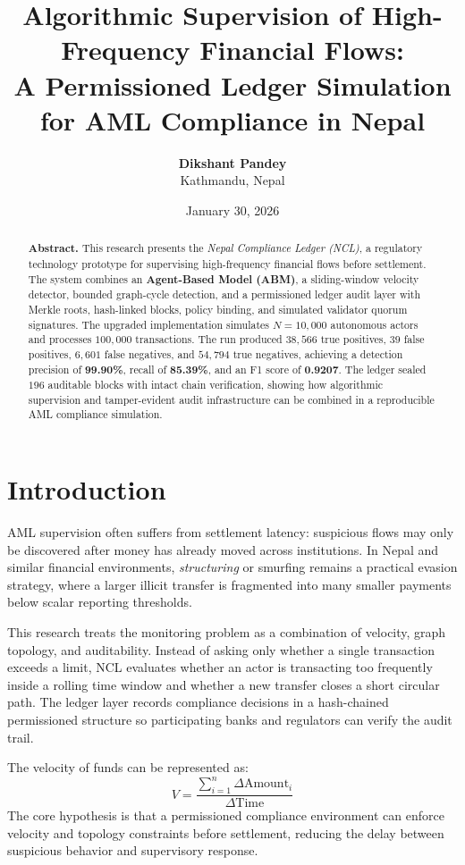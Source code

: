 \documentclass[11pt, letterpaper]{article}
\title{\textbf{Algorithmic Supervision of High-Frequency Financial Flows: \\ A Permissioned Ledger Simulation for AML Compliance in Nepal}}
\author{\textbf{Dikshant Pandey} \\ Kathmandu, Nepal}
\date{January 30, 2026}
\begin{document}
\maketitle

\begin{abstract}
\noindent \textbf{Abstract.} This research presents the \textit{Nepal Compliance Ledger (NCL)}, a regulatory technology prototype for supervising high-frequency financial flows before settlement. The system combines an \textbf{Agent-Based Model (ABM)}, a sliding-window velocity detector, bounded graph-cycle detection, and a permissioned ledger audit layer with Merkle roots, hash-linked blocks, policy binding, and simulated validator quorum signatures. The upgraded implementation simulates $N=10{,}000$ autonomous actors and processes $100{,}000$ transactions. The run produced $38{,}566$ true positives, $39$ false positives, $6{,}601$ false negatives, and $54{,}794$ true negatives, achieving a detection precision of \textbf{99.90\%}, recall of \textbf{85.39\%}, and an F1 score of \textbf{0.9207}. The ledger sealed $196$ auditable blocks with intact chain verification, showing how algorithmic supervision and tamper-evident audit infrastructure can be combined in a reproducible AML compliance simulation.
\end{abstract}

\section{Introduction}
AML supervision often suffers from settlement latency: suspicious flows may only be discovered after money has already moved across institutions. In Nepal and similar financial environments, \textit{structuring} or smurfing remains a practical evasion strategy, where a larger illicit transfer is fragmented into many smaller payments below scalar reporting thresholds.

This research treats the monitoring problem as a combination of velocity, graph topology, and auditability. Instead of asking only whether a single transaction exceeds a limit, NCL evaluates whether an actor is transacting too frequently inside a rolling time window and whether a new transfer closes a short circular path. The ledger layer records compliance decisions in a hash-chained permissioned structure so participating banks and regulators can verify the audit trail.

The velocity of funds can be represented as:
\begin{equation}
    V = \frac{\sum_{i=1}^{n} \Delta \text{Amount}_i}{\Delta \text{Time}}
\end{equation}
The core hypothesis is that a permissioned compliance environment can enforce velocity and topology constraints before settlement, reducing the delay between suspicious behavior and supervisory response.
\end{document}

